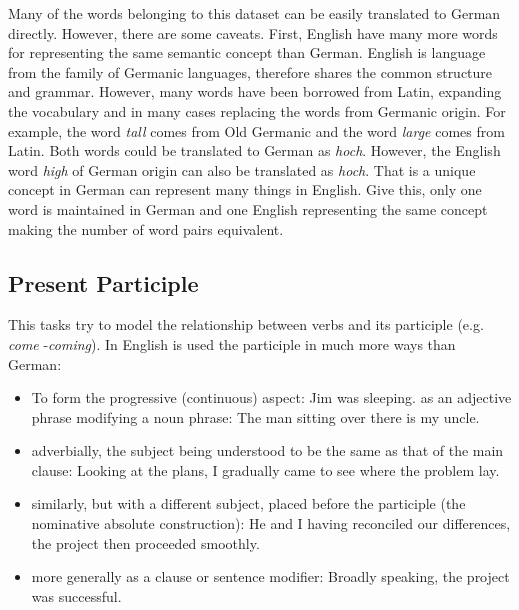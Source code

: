 Many of the words belonging to this dataset can be easily translated to
German directly. However, there are some caveats. First, English have many
more words for representing the same semantic concept than German.  English is language from
the family of Germanic languages, therefore shares the common structure
and grammar. However, many words have been borrowed from Latin, expanding the
vocabulary  and in many cases replacing the words from Germanic origin. 
For example, the word \textit{tall}  comes from Old Germanic and  the
word \textit{large} comes from Latin. Both words could be translated to
German as \textit{hoch}. However, the English word  \textit{high} of German
origin can also be translated as \textit{hoch}.
That is a unique concept in German can represent many things in English. 
Give this, only one word is maintained in German and one English representing
the same concept making the number of word pairs equivalent.


%
\subsection{Present Participle}
\label{sec:sub_sec_present_participle}

This tasks try to model the relationship between verbs and its participle
(e.g. \textit{come} -\textit{coming}). In English is used the participle in
much more ways than German: 

\begin{itemize}
\item  To form the progressive (continuous) aspect: Jim was sleeping. as an
  adjective phrase modifying a noun phrase: The man sitting over there is my
  uncle.
\item adverbially, the subject being understood to be the same as that
  of the main clause: Looking at the plans, I gradually came to see where the
  problem lay.
\item  similarly, but with a different subject, placed before the
  participle (the nominative absolute construction): He and I having
  reconciled our differences, the project then proceeded smoothly.
\item more
  generally as a clause or sentence modifier: Broadly speaking, the project
  was successful.

\end{itemize}

